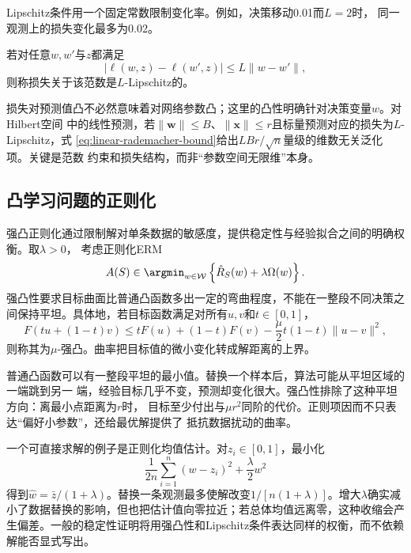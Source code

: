 Lipschitz条件用一个固定常数限制变化率。例如，决策移动0.01而$L=2$时，
同一观测上的损失变化最多为0.02。

\begin{definition}[Lipschitz损失]
\label{def:lipschitz-loss}
若对任意$w,w'$与$z$都满足
\begin{equation}
 |\ell(w,z)-\ell(w',z)|\leq L\|w-w'\|,
 \label{eq:lipschitz-loss}
\end{equation}
则称损失关于该范数是$L$-Lipschitz的。
\end{definition}

损失对预测值凸不必然意味着对网络参数凸；这里的凸性明确针对决策变量$w$。对Hilbert空间
中的线性预测，若$\|\bm w\|\leq B$、$\|\bm x\|\leq r$且标量预测对应的损失为$L$-Lipschitz，式
\eqref{eq:linear-rademacher-bound}给出$LBr/\sqrt n$量级的维数无关泛化项。关键是范数
约束和损失结构，而非“参数空间无限维”本身。

\subsection{凸学习问题的正则化}

强凸正则化通过限制解对单条数据的敏感度，提供稳定性与经验拟合之间的明确权衡。取$\lambda>0$，
考虑正则化ERM
\begin{equation}
 A(S)\in\argmin_{w\in\mathcal W}
 \left\{\hat R_S(w)+\lambda\Omega(w)\right\}.
 \label{eq:regularized-erm}
\end{equation}
强凸性要求目标曲面比普通凸函数多出一定的弯曲程度，不能在一整段不同决策之间保持平坦。具体地，若目标函数满足对所有$u,v$和$t\in[0,1]$，
\begin{equation}
 F(tu+(1-t)v)\leq tF(u)+(1-t)F(v)
 -\frac\mu2t(1-t)\|u-v\|^2,
 \label{eq:strong-convexity}
\end{equation}
则称其为$\mu$-强凸。曲率把目标值的微小变化转成解距离的上界。

普通凸函数可以有一整段平坦的最小值。替换一个样本后，算法可能从平坦区域的一端跳到另一
端，经验目标几乎不变，预测却变化很大。强凸性排除了这种平坦方向：离最小点距离为$r$时，
目标至少付出与$\mu r^2$同阶的代价。正则项因而不只表达“偏好小参数”，还给最优解提供了
抵抗数据扰动的曲率。

一个可直接求解的例子是正则化均值估计。对$z_i\in[0,1]$，最小化
\[
 \frac1{2n}\sum_{i=1}^n(w-z_i)^2+\frac\lambda2w^2
\]
得到$\hat w=\bar z/(1+\lambda)$。替换一条观测最多使解改变$1/[n(1+\lambda)]$。增大$\lambda$确实减小了数据替换的影响，但也把估计值向零拉近；若总体均值远离零，这种收缩会产生偏差。一般的稳定性证明将用强凸性和Lipschitz条件表达同样的权衡，而不依赖解能否显式写出。

